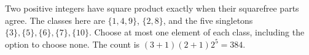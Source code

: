 Two positive integers have square product exactly when their squarefree parts agree. The classes here are $\{1,4,9\}$, $\{2,8\}$, and the five singletons $\{3\},\{5\},\{6\},\{7\},\{10\}$. Choose at most one element of each class, including the option to choose none. The count is $(3+1)(2+1)2^5=\boxed{384}$.
